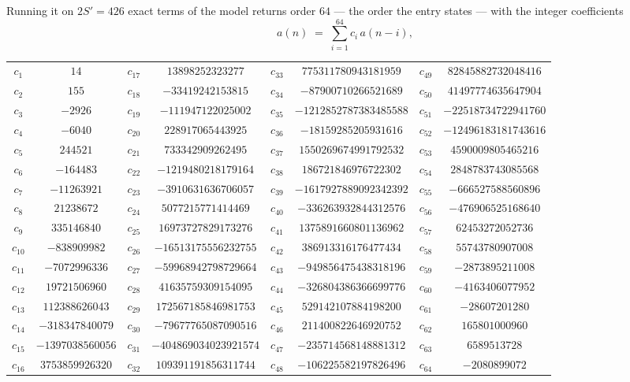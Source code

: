\documentclass[11pt,a4paper]{article}
\theoremstyle{plain}
\theoremstyle{definition}
\begin{document}
Running it on $2S'=426$ exact terms of the model returns order $64$ --- the order the
entry states --- with the integer coefficients
\[
a(n)\;=\;\sum_{i=1}^{64}c_i\,a(n-i),
\]
\begin{center}\small
\begin{tabular}{cccccccc}
$c_{1}$ & $14$ & $c_{17}$ & $13898252323277$ & $c_{33}$ & $775311780943181959$ & $c_{49}$ & $82845882732048416$ \\
$c_{2}$ & $155$ & $c_{18}$ & $-33419242153815$ & $c_{34}$ & $-87900710266521689$ & $c_{50}$ & $41497774635647904$ \\
$c_{3}$ & $-2926$ & $c_{19}$ & $-111947122025002$ & $c_{35}$ & $-1212852787383485588$ & $c_{51}$ & $-22518734722941760$ \\
$c_{4}$ & $-6040$ & $c_{20}$ & $228917065443925$ & $c_{36}$ & $-18159285205931616$ & $c_{52}$ & $-12496183181743616$ \\
$c_{5}$ & $244521$ & $c_{21}$ & $733342909262495$ & $c_{37}$ & $1550269674991792532$ & $c_{53}$ & $4590009805465216$ \\
$c_{6}$ & $-164483$ & $c_{22}$ & $-1219480218179164$ & $c_{38}$ & $186721846976722302$ & $c_{54}$ & $2848783743085568$ \\
$c_{7}$ & $-11263921$ & $c_{23}$ & $-3910631636706057$ & $c_{39}$ & $-1617927889092342392$ & $c_{55}$ & $-666527588560896$ \\
$c_{8}$ & $21238672$ & $c_{24}$ & $5077215771414469$ & $c_{40}$ & $-336263932844312576$ & $c_{56}$ & $-476906525168640$ \\
$c_{9}$ & $335146840$ & $c_{25}$ & $16973727829173276$ & $c_{41}$ & $1375891660801136962$ & $c_{57}$ & $62453272052736$ \\
$c_{10}$ & $-838909982$ & $c_{26}$ & $-16513175556232755$ & $c_{42}$ & $386913316176477434$ & $c_{58}$ & $55743780907008$ \\
$c_{11}$ & $-7072996336$ & $c_{27}$ & $-59968942798729664$ & $c_{43}$ & $-949856475438318196$ & $c_{59}$ & $-2873895211008$ \\
$c_{12}$ & $19721506960$ & $c_{28}$ & $41635759309154095$ & $c_{44}$ & $-326804386366699776$ & $c_{60}$ & $-4163406077952$ \\
$c_{13}$ & $112388626043$ & $c_{29}$ & $172567185846981753$ & $c_{45}$ & $529142107884198200$ & $c_{61}$ & $-28607201280$ \\
$c_{14}$ & $-318347840079$ & $c_{30}$ & $-79677765087090516$ & $c_{46}$ & $211400822646920752$ & $c_{62}$ & $165801000960$ \\
$c_{15}$ & $-1397038560056$ & $c_{31}$ & $-404869034023921574$ & $c_{47}$ & $-235714568148881312$ & $c_{63}$ & $6589513728$ \\
$c_{16}$ & $3753859926320$ & $c_{32}$ & $109391191856311744$ & $c_{48}$ & $-106225582197826496$ & $c_{64}$ & $-2080899072$ \\
\end{tabular}
\end{center}
\end{document}

